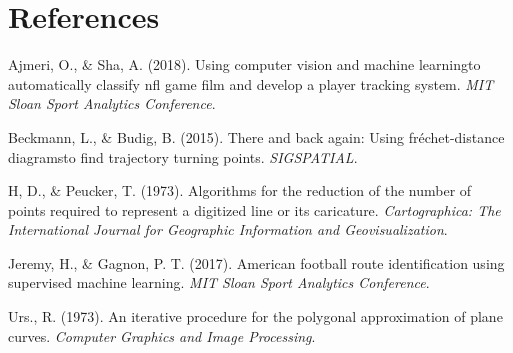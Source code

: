 \documentclass[12pt,oneside]{dukestatscithesis}
\theoremstyle{definition}
\theoremstyle{definition}
\theoremstyle{definition}
\theoremstyle{remark}
\begin{document}
\backmatter

\chapter*{References}\label{references}


\noindent

\setlength{\parindent}{-0.20in} \setlength{\leftskip}{0.20in}
\setlength{\parskip}{8pt}

\hypertarget{refs}{}
\hypertarget{ref-barnett}{}
Ajmeri, O., \& Sha, A. (2018). Using computer vision and machine
learningto automatically classify nfl game film and develop a player
tracking system. \emph{MIT Sloan Sport Analytics Conference}.

\hypertarget{ref-beckmann}{}
Beckmann, L., \& Budig, B. (2015). There and back again: Using
fréchet-distance diagramsto find trajectory turning points.
\emph{SIGSPATIAL}.

\hypertarget{ref-david}{}
H, D., \& Peucker, T. (1973). Algorithms for the reduction of the number
of points required to represent a digitized line or its caricature.
\emph{Cartographica: The International Journal for Geographic
Information and Geovisualization}.

\hypertarget{ref-jeremy}{}
Jeremy, H., \& Gagnon, P. T. (2017). American football route
identification using supervised machine learning. \emph{MIT Sloan Sport
Analytics Conference}.

\hypertarget{ref-ramer}{}
Urs., R. (1973). An iterative procedure for the polygonal approximation
of plane curves. \emph{Computer Graphics and Image Processing}.


\end{document}
